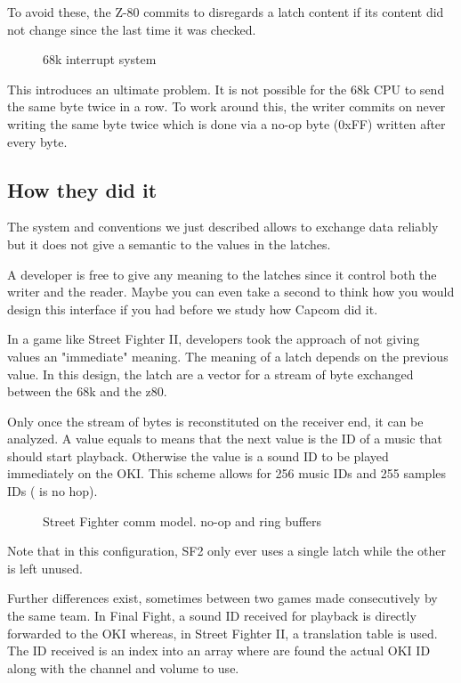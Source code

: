 To avoid these, the Z-80 commits to disregards a latch content if its content did not change since the last time it was checked.

\begin{figure}[H]
\caption*{68k interrupt system}
\end{figure}

This introduces an ultimate problem. It is not possible for the 68k CPU to send the same byte twice in a row. To work around this, the writer commits on never writing the same byte twice which is done via a no-op byte (0xFF) written after every byte.




\subsection{How they did it}
The system and conventions we just described allows to exchange data reliably but it does not give a semantic to the values in the latches. 

A developer is free to give any meaning to the latches since it control both the writer and the reader. Maybe you can even take a second to think how you would design this interface if you had before we study how Capcom did it.

In a game like Street Fighter II, developers took the approach of not giving values an "immediate" meaning. The meaning of a latch depends on the previous value. In this design, the latch are a vector for a stream of byte exchanged between the 68k and the z80.




Only once the stream of bytes is reconstituted on the receiver end, it can be analyzed. A value equals to  means that the next value is the ID of a music that should start playback. Otherwise the value is a sound ID to be played immediately on the OKI. This scheme allows for 256 music IDs and 255 samples IDs ( is no hop).

 \begin{figure}[H]
\caption*{Street Fighter comm model.  no-op and ring buffers}
\end{figure}

Note that in this configuration, SF2 only ever uses a single latch while the other is left unused.

Further differences exist, sometimes between two games made consecutively by the same team. In Final Fight, a sound ID received for playback is directly forwarded to the OKI whereas, in Street Fighter II, a translation table is used. The ID received is an index into an array where are found the actual OKI ID along with the channel and volume to use.

